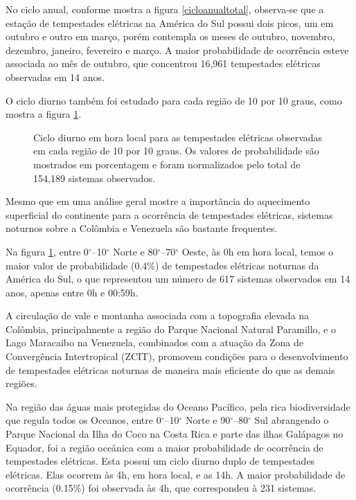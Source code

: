 No ciclo anual, conforme mostra a figura \ref{cicloanualtotal}, observa-se que a estação de tempestades elétricas na América do Sul possui dois picos, um em outubro e outro em março, porém contempla os meses de outubro, novembro, dezembro, janeiro, fevereiro e março. A maior probabilidade de ocorrência esteve associada ao mês de outubro, que concentrou 16,961 tempestades elétricas observadas em 14 anos. %


O ciclo diurno também foi estudado para cada região de 10 por 10 graus, como mostra a figura \ref{diurno}. 



\begin{figure}[!hb]
\caption{Ciclo diurno em hora local para as tempestades elétricas observadas em cada região de 10 por 10 graus. Os valores de probabilidade são mostrados em porcentagem e foram normalizados pelo total de 154,189 sistemas observados.}
\label{diurno}
\end{figure}


Mesmo que em uma análise geral mostre a importância do aquecimento superficial do continente para a ocorrência de tempestades elétricas, sistemas noturnos sobre a Colômbia e Venezuela são bastante frequentes.

Na figura \ref{diurno}, entre 0$^{\circ}$--10$^{\circ}$ Norte e 80$^{\circ}$--70$^{\circ}$ Oeste, às 0h em hora local, temos o maior valor de probabilidade (0.4\%) de tempestades elétricas noturnas da América do Sul, o que representou um número de 617 sistemas observados em 14 anos, apenas entre 0h e 00:59h.


A circulação de vale e montanha associada com a topografia elevada na Colômbia, principalmente a região do Parque Nacional Natural Paramillo, e o Lago Maracaibo na Venezuela, combinados com a atuação da Zona de Convergência Intertropical (ZCIT), promovem condições para o desenvolvimento de tempestades elétricas noturnas de maneira mais eficiente do que as demais regiões. 

  
Na região das águas mais protegidas do Oceano Pacífico, pela rica biodiversidade que regula todos os Oceanos, entre 0$^{\circ}$--10$^{\circ}$ Norte e 90$^{\circ}$--80$^{\circ}$ Sul abrangendo o Parque Nacional da Ilha do Coco na Costa Rica e parte das ilhas Galápagos no Equador, foi a região oceânica com a maior probabilidade de ocorrência de tempestades elétricas. Esta possui um ciclo diurno duplo de tempestades elétricas. Elas ocorrem às 4h, em hora local, e as 14h. A maior probabilidade de ocorrência (0.15\%) foi observada às 4h, que correspondeu à 231 sistemas.

